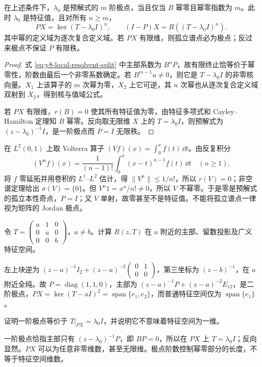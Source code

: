 \begin{theorem}[极点、幂零性与广义特征空间]\label{thm:y8-pole}
在上述条件下，$\lambda_0$ 是预解式的 $m$ 阶极点，当且仅当 $B$ 幂零且幂零指数为 $m$。此时 $\lambda_0$ 是特征值，且对所有 $n\ge m$，
\begin{equation}\label{eq:y8-pole-decomposition}
 PX=\ker(T-\lambda_0I)^n,\qquad
 (I-P)X=R((T-\lambda_0I)^n).
\end{equation}
其中幂的定义域为逐次复合定义域。若 $PX$ 有限维，则孤立谱点必为极点；反过来极点不保证 $P$ 有限秩。
\end{theorem}
\begin{proof}
式 \eqref{eq:y8-local-resolvent-split} 中主部系数为 $B^nP$，故有限终止恰等价于幂零性，阶数由最后一个非零系数确定。若 $B^{m-1}u\ne0$，则它是 $T-\lambda_0I$ 的非零核向量。$X_1$ 上该算子的 $m$ 次幂为零，$X_2$ 上它可逆，其 $n$ 次幂也从逐次复合定义域双射到 $X_2$，得到核与值域公式。

若 $PX$ 有限维，$r(B)=0$ 使其所有特征值为零，由特征多项式和 Cayley--Hamilton 定理知 $B$ 幂零。反向取无限维 $X$ 上的 $T=\lambda_0I$，则预解式为 $(z-\lambda_0)^{-1}I$，是一阶极点而 $P=I$ 无限秩。
\end{proof}

\begin{example}[孤立谱点也可能是本性奇点]
在 $L^2(0,1)$ 上取 Volterra 算子 $(Vf)(x)=\int_0^xf(t)\,\dd t$。由反复积分
\[
 (V^nf)(x)=\frac1{(n-1)!}\int_0^x(x-t)^{n-1}f(t)\,\dd t
 \quad(n\ge1).
\]
将 $f$ 零延拓并用卷积的 $L^1$--$L^2$ 估计，得 $\|V^n\|\le1/n!$，所以 $r(V)=0$；非空谱定理给出 $\sigma(V)=\{0\}$。但 $V^n1=x^n/n!\ne0$，所以 $V$ 不幂零。于是零是预解式的孤立本性奇点，$P=I$；又 $V$ 单射，故零甚至不是特征值。不能将孤立谱点一律视为矩阵的 Jordan 极点。
\end{example}

\begin{exercise}[二阶极点与留数]\label{ex:y8-pole-jordan}
令 $T=\left(\begin{smallmatrix}a&1&0\\0&a&0\\0&0&b\end{smallmatrix}\right)$，$a\ne b$。计算 $R(z,T)$ 在 $a$ 附近的主部、留数投影及广义特征空间。
\end{exercise}
\begin{solution}
左上块逆为 $(z-a)^{-1}I_2+(z-a)^{-2}\left(\begin{smallmatrix}0&1\\0&0\end{smallmatrix}\right)$，第三坐标为 $(z-b)^{-1}$，在 $a$ 附近全纯。故 $P=\operatorname{diag}(1,1,0)$，主部为 $(z-a)^{-1}P+(z-a)^{-2}E_{12}$，是二阶极点，$PX=\ker(T-aI)^2=\operatorname{span}\{e_1,e_2\}$，而普通特征空间仅为 $\operatorname{span}\{e_1\}$。
\end{solution}

\begin{exercise}[一阶极点的含义]\label{ex:y8-simple-pole}
证明一阶极点等价于 $T|_{PX}=\lambda_0I$，并说明它不意味着特征空间为一维。
\end{exercise}
\begin{solution}
一阶极点恰指主部只有 $(z-\lambda_0)^{-1}P$，即 $BP=0$，所以在 $PX$ 上 $T=\lambda_0I$；反向显然。$PX$ 可以为任意非零维数，甚至无限维。极点阶数控制幂零部分的长度，不等于特征空间维数。
\end{solution}
